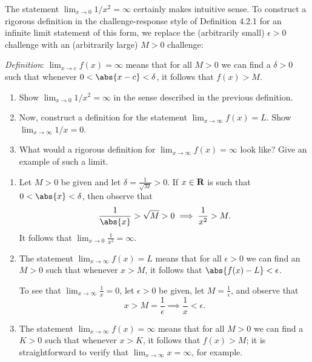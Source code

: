 \documentclass{lew98_solutions}
\begin{document}
\begin{exercise}
\label{ex:4.2.9}
    The statement \( \lim_{x \to 0} 1/x^2 = \infty \) certainly makes intuitive sense. To construct a rigorous definition in the challenge-response style of Definition 4.2.1 for an infinite limit statement of this form, we replace the (arbitrarily small) \( \epsilon > 0 \) challenge with an (arbitrarily large) \( M > 0 \) challenge:

    \textit{Definition}: \( \lim_{x \to c} f(x) = \infty \) means that for all \( M > 0 \) we can find a \( \delta > 0 \) such that whenever \( 0 < \abs{x - c} < \delta \), it follows that \( f(x) > M \).
    \begin{enumerate}
        \item Show \( \lim_{x \to 0} 1/x^2 = \infty \) in the sense described in the previous definition.

        \item Now, construct a definition for the statement \( \lim_{x \to \infty} f(x) = L \). Show \( \lim_{x \to \infty} 1/x = 0 \).

        \item What would a rigorous definition for \( \lim_{x \to \infty} f(x) = \infty \) look like? Give an example of such a limit.
    \end{enumerate}
\end{exercise}

\begin{solution}
    \begin{enumerate}
        \item Let \( M > 0 \) be given and let \( \delta = \tfrac{1}{\sqrt{M}} > 0 \). If \( x \in \mathbf{R} \) is such that \( 0 < \abs{x} < \delta \), then observe that
        \[
            \frac{1}{\abs{x}} > \sqrt{M} > 0 \implies \frac{1}{x^2} > M.
        \]
        It follows that \( \lim_{x \to 0} \tfrac{1}{x^2} = \infty \).

        \item The statement \( \lim_{x \to \infty} f(x) = L \) means that for all \( \epsilon > 0 \) we can find an \( M > 0 \) such that whenever \( x > M \), it follows that \( \abs{f(x) - L} < \epsilon \).

        To see that \( \lim_{x \to \infty} \tfrac{1}{x} = 0 \), let \( \epsilon > 0 \) be given, let \( M = \tfrac{1}{\epsilon} \), and observe that
        \[
            x > M = \frac{1}{\epsilon} \implies \frac{1}{x} < \epsilon.
        \]

        \item The statement \( \lim_{x \to \infty} f(x) = \infty \) means that for all \( M > 0 \) we can find a \( K > 0 \) such that whenever \( x > K \), it follows that \( f(x) > M \); it is straightforward to verify that \( \lim_{x \to \infty} x = \infty \), for example.
    \end{enumerate}
\end{solution}
\end{document}
